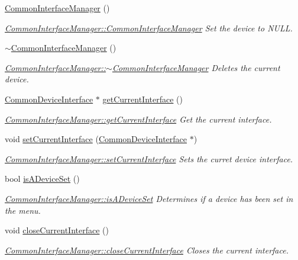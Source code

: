 \begin{DoxyCompactItemize}
\item 
\hyperlink{class_common_interface_manager_a3f970287bd77d17ea41a6795b25ce7e3}{Common\+Interface\+Manager} ()
\begin{DoxyCompactList}\small\item\em \hyperlink{class_common_interface_manager_a3f970287bd77d17ea41a6795b25ce7e3}{Common\+Interface\+Manager\+::\+Common\+Interface\+Manager} Set the device to N\+U\+LL. \end{DoxyCompactList}\item 
\hyperlink{class_common_interface_manager_ad92cabe2e4f39fd762cf621df5125fa1}{$\sim$\+Common\+Interface\+Manager} ()
\begin{DoxyCompactList}\small\item\em \hyperlink{class_common_interface_manager_ad92cabe2e4f39fd762cf621df5125fa1}{Common\+Interface\+Manager\+::$\sim$\+Common\+Interface\+Manager} Deletes the current device. \end{DoxyCompactList}\item 
\hyperlink{class_common_device_interface}{Common\+Device\+Interface} $\ast$ \hyperlink{class_common_interface_manager_a24a72b0f78f9e6037e2da899e8170b2f}{get\+Current\+Interface} ()
\begin{DoxyCompactList}\small\item\em \hyperlink{class_common_interface_manager_a24a72b0f78f9e6037e2da899e8170b2f}{Common\+Interface\+Manager\+::get\+Current\+Interface} Get the current interface. \end{DoxyCompactList}\item 
void \hyperlink{class_common_interface_manager_add704853a060d8cca441da322b748c19}{set\+Current\+Interface} (\hyperlink{class_common_device_interface}{Common\+Device\+Interface} $\ast$)
\begin{DoxyCompactList}\small\item\em \hyperlink{class_common_interface_manager_add704853a060d8cca441da322b748c19}{Common\+Interface\+Manager\+::set\+Current\+Interface} Sets the curret device interface. \end{DoxyCompactList}\item 
bool \hyperlink{class_common_interface_manager_abd7a314803309cdb6789eaf36f90b7b7}{is\+A\+Device\+Set} ()
\begin{DoxyCompactList}\small\item\em \hyperlink{class_common_interface_manager_abd7a314803309cdb6789eaf36f90b7b7}{Common\+Interface\+Manager\+::is\+A\+Device\+Set} Determines if a device has been set in the menu. \end{DoxyCompactList}\item 
void \hyperlink{class_common_interface_manager_a16ab6917c45e1b40efe61d5379206ceb}{close\+Current\+Interface} ()
\begin{DoxyCompactList}\small\item\em \hyperlink{class_common_interface_manager_a16ab6917c45e1b40efe61d5379206ceb}{Common\+Interface\+Manager\+::close\+Current\+Interface} Closes the current interface. \end{DoxyCompactList}\end{DoxyCompactItemize}


